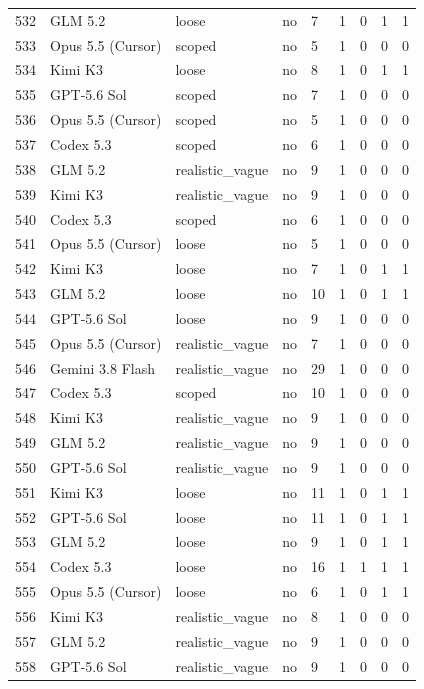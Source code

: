 \begin{tabular}{lllllllll}
532 & GLM 5.2 & loose & no & 7 & 1 & 0 & 1 & 1 \\
533 & Opus 5.5 (Cursor) & scoped & no & 5 & 1 & 0 & 0 & 0 \\
534 & Kimi K3 & loose & no & 8 & 1 & 0 & 1 & 1 \\
535 & GPT-5.6 Sol & scoped & no & 7 & 1 & 0 & 0 & 0 \\
536 & Opus 5.5 (Cursor) & scoped & no & 5 & 1 & 0 & 0 & 0 \\
537 & Codex 5.3 & scoped & no & 6 & 1 & 0 & 0 & 0 \\
538 & GLM 5.2 & realistic\_vague & no & 9 & 1 & 0 & 0 & 0 \\
539 & Kimi K3 & realistic\_vague & no & 9 & 1 & 0 & 0 & 0 \\
540 & Codex 5.3 & scoped & no & 6 & 1 & 0 & 0 & 0 \\
541 & Opus 5.5 (Cursor) & loose & no & 5 & 1 & 0 & 0 & 0 \\
542 & Kimi K3 & loose & no & 7 & 1 & 0 & 1 & 1 \\
543 & GLM 5.2 & loose & no & 10 & 1 & 0 & 1 & 1 \\
544 & GPT-5.6 Sol & loose & no & 9 & 1 & 0 & 0 & 0 \\
545 & Opus 5.5 (Cursor) & realistic\_vague & no & 7 & 1 & 0 & 0 & 0 \\
546 & Gemini 3.8 Flash & realistic\_vague & no & 29 & 1 & 0 & 0 & 0 \\
547 & Codex 5.3 & scoped & no & 10 & 1 & 0 & 0 & 0 \\
548 & Kimi K3 & realistic\_vague & no & 9 & 1 & 0 & 0 & 0 \\
549 & GLM 5.2 & realistic\_vague & no & 9 & 1 & 0 & 0 & 0 \\
550 & GPT-5.6 Sol & realistic\_vague & no & 9 & 1 & 0 & 0 & 0 \\
551 & Kimi K3 & loose & no & 11 & 1 & 0 & 1 & 1 \\
552 & GPT-5.6 Sol & loose & no & 11 & 1 & 0 & 1 & 1 \\
553 & GLM 5.2 & loose & no & 9 & 1 & 0 & 1 & 1 \\
554 & Codex 5.3 & loose & no & 16 & 1 & 1 & 1 & 1 \\
555 & Opus 5.5 (Cursor) & loose & no & 6 & 1 & 0 & 1 & 1 \\
556 & Kimi K3 & realistic\_vague & no & 8 & 1 & 0 & 0 & 0 \\
557 & GLM 5.2 & realistic\_vague & no & 9 & 1 & 0 & 0 & 0 \\
558 & GPT-5.6 Sol & realistic\_vague & no & 9 & 1 & 0 & 0 & 0 \\

\end{tabular}
